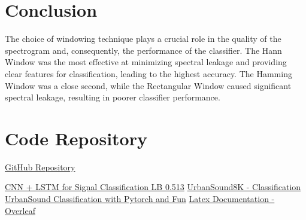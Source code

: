 \documentclass[a4paper,12pt]{article}
\begin{document}
\section{Conclusion}
The choice of windowing technique plays a crucial role in the quality of the spectrogram and, consequently, the performance of the classifier. The Hann Window was the most effective at minimizing spectral leakage and providing clear features for classification, leading to the highest accuracy. The Hamming Window was a close second, while the Rectangular Window caused significant spectral leakage, resulting in poorer classifier performance.

\newpage
\section{Code Repository}
\href{https://github.com/IITJ-Projects/M23CSA545_PA1.git}{ GitHub Repository}
%
\begin{thebibliography}{9}
     \href{https://www.kaggle.com/code/afajohn/cnn-lstm-for-signal-classification-lb-0-513}{CNN + LSTM for Signal Classification LB 0.513}
     \href{https://www.kaggle.com/code/prabhavsingh/urbansound8k-classification}{ UrbanSound8K - Classification}
     \href{https://www.kaggle.com/code/adinishad/urbansound-classification-with-pytorch-and-fun}{ UrbanSound Classification with Pytorch and Fun}
      \href{https://www.overleaf.com/}{ Latex Documentation - Overleaf}
\end{thebibliography}
\end{document}
